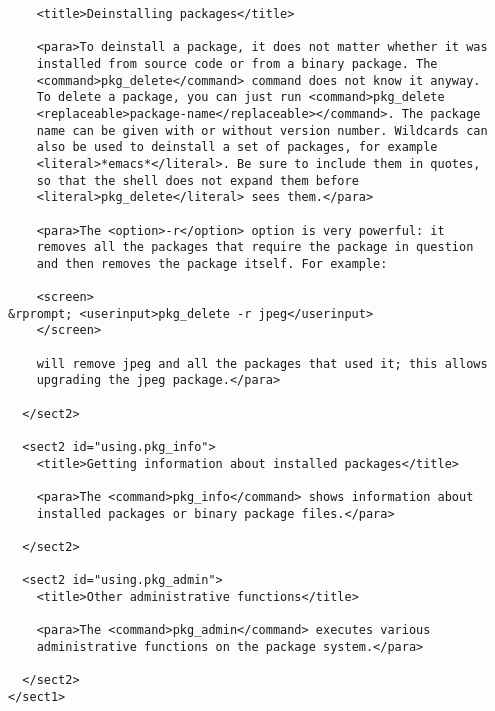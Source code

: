 \begin{verbatim}
    <title>Deinstalling packages</title>

    <para>To deinstall a package, it does not matter whether it was
    installed from source code or from a binary package. The
    <command>pkg_delete</command> command does not know it anyway.
    To delete a package, you can just run <command>pkg_delete
    <replaceable>package-name</replaceable></command>. The package
    name can be given with or without version number. Wildcards can
    also be used to deinstall a set of packages, for example
    <literal>*emacs*</literal>. Be sure to include them in quotes,
    so that the shell does not expand them before
    <literal>pkg_delete</literal> sees them.</para>

    <para>The <option>-r</option> option is very powerful: it
    removes all the packages that require the package in question
    and then removes the package itself. For example:

    <screen>
&rprompt; <userinput>pkg_delete -r jpeg</userinput>
    </screen>

    will remove jpeg and all the packages that used it; this allows
    upgrading the jpeg package.</para>

  </sect2>

  <sect2 id="using.pkg_info">
    <title>Getting information about installed packages</title>

    <para>The <command>pkg_info</command> shows information about
    installed packages or binary package files.</para>

  </sect2>

  <sect2 id="using.pkg_admin">
    <title>Other administrative functions</title>

    <para>The <command>pkg_admin</command> executes various
    administrative functions on the package system.</para>

  </sect2>
</sect1>
\end{verbatim}
